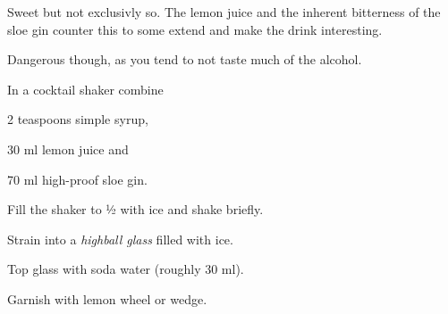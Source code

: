 \startsection[title={Sloe Gin Fizz},reference=sloeginfizz]
Sweet but not exclusivly so. The lemon juice and the inherent bitterness
of the sloe gin counter this to some extend and make the drink interesting.

Dangerous though, as you tend to not taste much of the alcohol.

\startitemize
\item In a cocktail shaker combine
      \startitemize
      \item 2 teaspoons simple syrup,
      \item 30 ml lemon juice and
      \item 70 ml high-proof sloe gin.
      \stopitemize
\item Fill the shaker to ½ with ice and shake briefly.
\item Strain into a {\em highball glass} filled with ice.
\item Top glass with \tr soda water (roughly 30 ml).
\item Garnish with \tr lemon wheel or wedge.
\stopitemize
